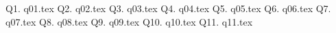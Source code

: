 

\newcommand\myincludetex[1]{\textbox{{\scriptsize \texttt{#1}}}

    
}

\newcommand\myincludesrc[1]{\textbox{{\scriptsize \texttt{#1}}}
    
    \VerbatimInput[fontsize=\footnotesize,frame=single]{#1}
}

Q1. {q01.tex}
\newpage Q2. {q02.tex}
\newpage Q3. {q03.tex}
\newpage Q4. {q04.tex}
\newpage Q5. {q05.tex}
\newpage Q6. {q06.tex}
\newpage Q7. {q07.tex}
\newpage Q8. {q08.tex}
\newpage Q9. {q09.tex}
\newpage Q10. {q10.tex}
\newpage Q11. {q11.tex}


    
